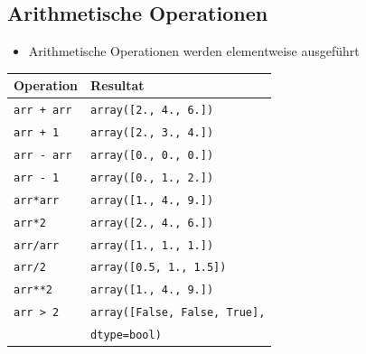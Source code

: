 \begin{minipage}[t]{0.44\textwidth}
	\subsection{Arithmetische Operationen}
	\begin{itemize}
		\item Arithmetische Operationen werden elementweise ausgeführt\\
	\end{itemize}

\begin{tabular}{|l|l|}
	\hline
	\textbf{Operation} &\textbf{Resultat}\\
	\hline
	\texttt{arr + arr} &\texttt{array([2., 4., 6.])}\\
	\texttt{arr + 1} &\texttt{array([2., 3., 4.])}\\
	\texttt{arr - arr} &\texttt{array([0., 0., 0.])}\\
	\texttt{arr - 1} &\texttt{array([0., 1., 2.])}\\
	\texttt{arr*arr} &\texttt{array([1., 4., 9.])}\\
	\texttt{arr*2} &\texttt{array([2., 4., 6.])}\\
	\texttt{arr/arr} &\texttt{array([1., 1., 1.])}\\
	\texttt{arr/2} &\texttt{array([0.5, 1., 1.5])}\\
	\texttt{arr**2} &\texttt{array([1., 4., 9.])}\\
	\texttt{arr > 2} &\texttt{array([False, False, True],} \\ &\texttt{dtype=bool)}\\
	\hline
\end{tabular}
\end{minipage}

